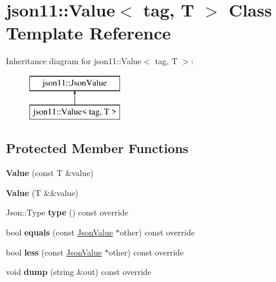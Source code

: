 \hypertarget{classjson11_1_1_value}{}\section{json11\+:\+:Value$<$ tag, T $>$ Class Template Reference}
\label{classjson11_1_1_value}
Inheritance diagram for json11\+:\+:Value$<$ tag, T $>$\+:\begin{figure}[H]
\begin{center}
\leavevmode
\includegraphics[height=2.000000cm]{classjson11_1_1_value}
\end{center}
\end{figure}
\subsection*{Protected Member Functions}
\begin{DoxyCompactItemize}
\item 
\mbox{\label{classjson11_1_1_value_a0ba1c06e0de70655878b52ae47c9d876}} 
{\bfseries Value} (const T \&value)
\item 
\mbox{\label{classjson11_1_1_value_adf0aaa04f8f04d67cd45e7065270f21c}} 
{\bfseries Value} (T \&\&value)
\item 
\mbox{\label{classjson11_1_1_value_a7f859afc6549e1616384c1ed8b95773e}} 
Json\+::\+Type {\bfseries type} () const override
\item 
\mbox{\label{classjson11_1_1_value_a9e55dfa0c1119e102fd9bd9bb5bb1f56}} 
bool {\bfseries equals} (const \mbox{\hyperlink{classjson11_1_1_json_value}{Json\+Value}} $\ast$other) const override
\item 
\mbox{\label{classjson11_1_1_value_a7ea36aadc76a335a6eaf4d44af154732}} 
bool {\bfseries less} (const \mbox{\hyperlink{classjson11_1_1_json_value}{Json\+Value}} $\ast$other) const override
\item 
\mbox{\label{classjson11_1_1_value_ac7c653a5479bb6f766e01a80bb06927f}} 
void {\bfseries dump} (string \&out) const override
\end{DoxyCompactItemize}
